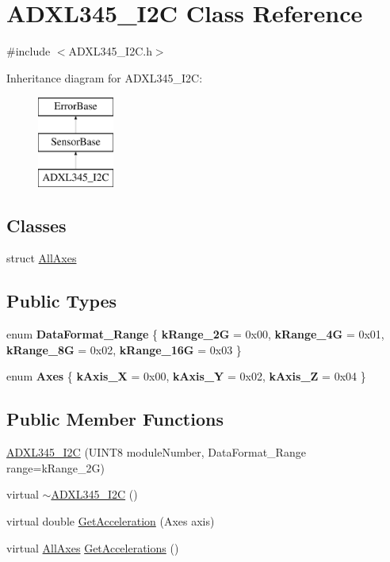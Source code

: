 \hypertarget{classADXL345__I2C}{
\section{ADXL345\_\-I2C Class Reference}
\label{classADXL345__I2C}
}


{\ttfamily \#include $<$ADXL345\_\-I2C.h$>$}

Inheritance diagram for ADXL345\_\-I2C:\begin{figure}[H]
\begin{center}
\leavevmode
\includegraphics[height=3.000000cm]{classADXL345__I2C}
\end{center}
\end{figure}
\subsection*{Classes}
\begin{DoxyCompactItemize}
\item 
struct \hyperlink{structADXL345__I2C_1_1AllAxes}{AllAxes}
\end{DoxyCompactItemize}
\subsection*{Public Types}
\begin{DoxyCompactItemize}
\item 
enum {\bfseries DataFormat\_\-Range} \{ {\bfseries kRange\_\-2G} = 0x00, 
{\bfseries kRange\_\-4G} = 0x01, 
{\bfseries kRange\_\-8G} = 0x02, 
{\bfseries kRange\_\-16G} = 0x03
 \}
\item 
enum {\bfseries Axes} \{ {\bfseries kAxis\_\-X} = 0x00, 
{\bfseries kAxis\_\-Y} = 0x02, 
{\bfseries kAxis\_\-Z} = 0x04
 \}
\end{DoxyCompactItemize}
\subsection*{Public Member Functions}
\begin{DoxyCompactItemize}
\item 
\hyperlink{classADXL345__I2C_a03820fed25e5d03a17406951434a04d5}{ADXL345\_\-I2C} (UINT8 moduleNumber, DataFormat\_\-Range range=kRange\_\-2G)
\item 
virtual \hyperlink{classADXL345__I2C_a3d56f96d66939a5cd6abbadaf94bcaae}{$\sim$ADXL345\_\-I2C} ()
\item 
virtual double \hyperlink{classADXL345__I2C_abc3a0bb889882e01cee781e3ab33af84}{GetAcceleration} (Axes axis)
\item 
virtual \hyperlink{structADXL345__I2C_1_1AllAxes}{AllAxes} \hyperlink{classADXL345__I2C_a6c36866e36c57e3aefd9ddc5685bcb2a}{GetAccelerations} ()
\end{DoxyCompactItemize}
